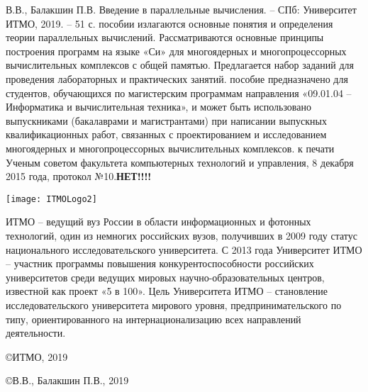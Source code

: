 { %
	\Large{} В.В., Балакшин П.В. Введение в параллельные вычисления. – СПб: Университет ИТМО, 2019. – 51 с.
	\newline
	\newline
	 пособии излагаются основные понятия и определения теории параллельных вычислений. Рассматриваются основные принципы построения программ на языке «Си» для многоядерных и многопроцессорных вычислительных комплексов с общей памятью. Предлагается набор заданий для проведения лабораторных и практических занятий.
	\newline
	\newline
	 пособие предназначено для студентов, обучающихся по магистерским программам направления «09.01.04 – Информатика и вычислительная техника», и может быть использовано выпускниками (бакалаврами и магистрантами) при написании выпускных квалификационных работ, связанных с проектированием и исследованием многоядерных и многопроцессорных вычислительных комплексов.
	\newline
	\newline
	 к печати Ученым советом факультета компьютерных технологий и управления, 8 декабря 2015 года, протокол №10.\textbf{НЕТ!!!!}
	\vspace*{\fill} %
	\begin{flushright}
		\texttt{[image: ITMOLogo2]}
	\end{flushright}
	 ИТМО – ведущий вуз России в области информационных и фотонных технологий, один из немногих российских вузов, получивших в 2009 году статус национального исследовательского университета. С 2013 года Университет ИТМО – участник программы повышения конкурентоспособности российских университетов среди ведущих мировых научно-образовательных центров, известной как проект «5 в 100». Цель Университета ИТМО – становление исследовательского университета мирового уровня, предпринимательского по типу, ориентированного на интернационализацию всех направлений деятельности.
	\begin{flushright}
		\copyright{} ИТМО, 2019
		\par\copyright{} В.В., Балакшин П.В., 2019
	\end{flushright}
}